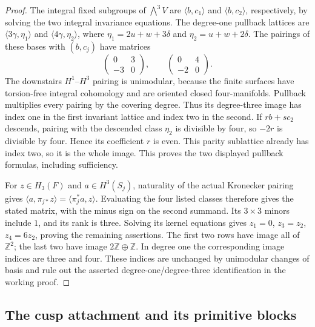 \begin{proof}
The integral fixed subgroups of $\bigwedge^3 V$ are
$\langle b,c_1\rangle$ and $\langle b,c_2\rangle$, respectively, by
solving the two integral invariance equations. The degree-one pullback
lattices are $\langle3\gamma,\eta_1\rangle$ and
$\langle4\gamma,\eta_2\rangle$, where
$\eta_1=2u+w+3\delta$ and $\eta_2=u+w+2\delta$.
The pairings of these bases with $(b,c_j)$ have matrices
\[
 \begin{pmatrix}0&3\\-3&0\end{pmatrix},\qquad
 \begin{pmatrix}0&4\\-2&0\end{pmatrix}.
\]
The downstairs $H^1$--$H^3$ pairing is unimodular, because the finite
surfaces have torsion-free integral cohomology and are oriented closed
four-manifolds. Pullback multiplies every pairing by the covering degree.
Thus its degree-three image has index one in the first invariant lattice
and index two in the second. If $rb+sc_2$ descends, pairing with the
descended class $\eta_2$ is divisible by four, so $-2r$ is divisible by
four. Hence its coefficient $r$ is even. This parity sublattice already
has index two, so it is the whole image. This proves the two displayed
pullback formulas, including sufficiency.

For $z\in H_3(F)$ and $a\in H^3(S_j)$, naturality of the actual
Kronecker pairing gives $\langle a,\pi_{j*}z\rangle
=\langle\pi_j^*a,z\rangle$. Evaluating the four listed classes therefore
gives the stated matrix, with the minus sign on the second summand.
Its $3\times3$ minors include $1$, and its rank is three. Solving its
kernel equations gives $z_1=0$, $z_3=z_2$, $z_4=6z_2$, proving the
remaining assertions. The first two rows have image all of $\mathbb Z^2$;
the last two have image $2\mathbb Z\oplus\mathbb Z$. In degree one the
corresponding image indices are three and four. These indices are
unchanged by unimodular changes of basis and rule out the asserted
degree-one/degree-three identification in the working proof.
\end{proof}


\subsection{The cusp attachment and its primitive blocks}

